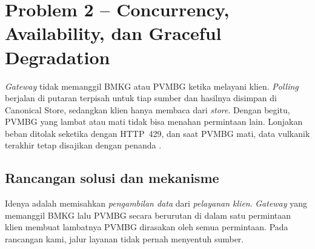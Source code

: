 \chapter{Problem 2 -- Concurrency, Availability, dan Graceful Degradation}

\begin{ringkas}
\emph{Gateway} tidak memanggil BMKG atau PVMBG ketika melayani klien. \emph{Polling} berjalan di putaran terpisah untuk tiap sumber dan
hasilnya disimpan di Canonical Store, sedangkan klien hanya membaca dari \emph{store}. Dengan begitu, PVMBG yang lambat atau mati
tidak bisa menahan permintaan lain. Lonjakan beban ditolak seketika dengan HTTP~429, dan saat PVMBG mati, data vulkanik
terakhir tetap disajikan dengan penanda .
\end{ringkas}

\section{Rancangan solusi dan mekanisme}

Idenya adalah memisahkan \emph{pengambilan data} dari \emph{pelayanan klien}. \emph{Gateway} yang memanggil BMKG lalu PVMBG
secara berurutan di dalam satu permintaan klien membuat lambatnya PVMBG dirasakan oleh semua permintaan. Pada rancangan
kami, jalur layanan tidak pernah menyentuh sumber.



